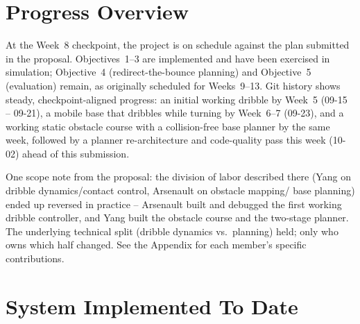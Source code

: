 \documentclass[10pt,twocolumn]{article}
\begin{document}

\section{Progress Overview}
At the Week~8 checkpoint, the project is on schedule against the plan
submitted in the proposal. Objectives~1--3 are implemented and have been
exercised in simulation; Objective~4 (redirect-the-bounce planning) and
Objective~5 (evaluation) remain, as originally scheduled for Weeks~9--13.
Git history shows steady, checkpoint-aligned progress: an initial working
dribble by Week~5 (09-15 -- 09-21), a mobile base that dribbles while
turning by Week~6--7 (09-23), and a working static obstacle course with a
collision-free base planner by the same week, followed by a planner
re-architecture and code-quality pass this week (10-02) ahead of this
submission.

One scope note from the proposal: the division of labor described there
(Yang on dribble dynamics/contact control, Arsenault on obstacle mapping/
base planning) ended up reversed in practice -- Arsenault built and
debugged the first working dribble controller, and Yang built the obstacle
course and the two-stage planner. The underlying technical split (dribble
dynamics vs.\ planning) held; only who owns which half changed. See the
Appendix for each member's specific contributions.

\section{System Implemented To Date}
\end{document}
